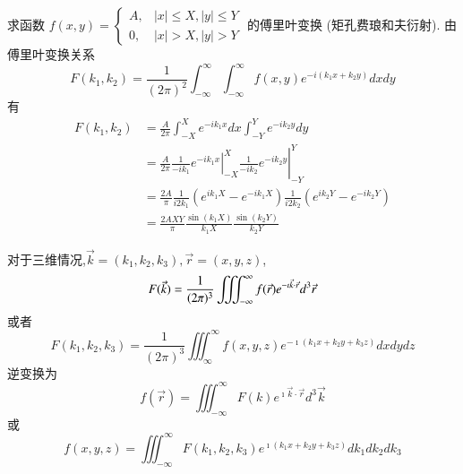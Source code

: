 \begin{examplebox}{
    求函数 $f(x, y)= \begin{cases}A, & |x| \leq X,|y| \leq Y \\ 0, & |x|>X,|y|>Y\end{cases}$ 的傅里叶变换 (矩孔费琅和夫衍射).
}
由傅里叶变换关系
$$
F\left(k_1, k_2\right)=\frac{1}{(2 \pi)^2} \int_{-\infty}^{\infty} \int_{-\infty}^{\infty} f(x, y) e^{-i\left(k_1 x+k_2 y\right)} d x d y
$$
有
$$
\begin{aligned}
F\left(k_1, k_2\right) & =\frac{A}{2 \pi} \int_{-X}^X e^{-i k_1 x} d x \int_{-Y}^Y e^{-i k_2 y} d y \\
& =\left.\left.\frac{A}{2 \pi} \frac{1}{-i k_1} e^{-i k_1 x}\right|_{-X} ^X \frac{1}{-i k_2} e^{-i k_2 y}\right|_{-Y} ^Y \\
& =\frac{2A}{\pi} \frac{1}{i 2 k_1}\left(e^{i k_1 X}-e^{-i k_1 X}\right) \frac{1}{i 2 k_2}\left(e^{i k_2 Y}-e^{-i k_2 Y}\right) \\
& =\frac{2A X Y}{\pi} \frac{\sin \left(k_1 X\right)}{k_1 X} \frac{\sin \left(k_2 Y\right)}{k_2 Y}
\end{aligned}
$$
\end{examplebox}

对于三维情况,$\vec{k}=\left(k_1, k_2, k_3\right), \vec{r}=(x, y, z)$,
\begin{equation}
    F(\vec{k})=\frac{1}{(2 \pi)^3} \iiint_{-\infty}^{\infty} f(\vec{r}) e^{-\imath  \vec{k} \cdot \vec{r}} d^3 \vec{r} \\
\end{equation}
或者
\begin{equation}
    F\left(k_1, k_2, k_3\right)=\frac{1}{(2 \pi)^3} \iiint_{\infty}^{\infty} f(x, y, z) e^{-\imath\left(k_1 x+k_2 y+k_3 z\right)} d x d y d z 
\end{equation}
逆变换为
\begin{equation}
     f(\vec{r})=\iiint_{-\infty}^{\infty} F(k) e^{\imath \vec{k} \cdot \vec{r}} d^3 \vec{k} 
\end{equation}  
或
\begin{equation}
f(x, y, z)=\iiint_{-\infty}^{\infty} F\left(k_1, k_2, k_3\right) e^{\imath\left(k_1 x+k_2 y+k_3 z\right)} d k_1 d k_2 d k_3 
\end{equation} 
